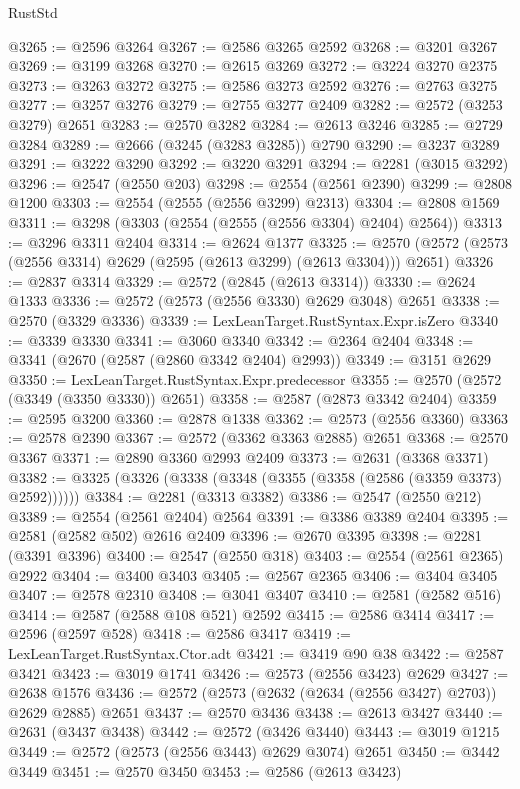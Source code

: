 \begin{lexlean}{RustStd}
\begin{coremodule}
@3265 := @2596 @3264
@3267 := @2586 @3265 @2592
@3268 := @3201 @3267
@3269 := @3199 @3268
@3270 := @2615 @3269
@3272 := @3224 @3270 @2375
@3273 := @3263 @3272
@3275 := @2586 @3273 @2592
@3276 := @2763 @3275
@3277 := @3257 @3276
@3279 := @2755 @3277 @2409
@3282 := @2572 (@3253 @3279) @2651
@3283 := @2570 @3282
@3284 := @2613 @3246
@3285 := @2729 @3284
@3289 := @2666 (@3245 (@3283 @3285)) @2790
@3290 := @3237 @3289
@3291 := @3222 @3290
@3292 := @3220 @3291
@3294 := @2281 (@3015 @3292)
@3296 := @2547 (@2550 @203)
@3298 := @2554 (@2561 @2390)
@3299 := @2808 @1200
@3303 := @2554 (@2555 (@2556 @3299) @2313)
@3304 := @2808 @1569
@3311 := @3298 (@3303 (@2554 (@2555 (@2556 @3304) @2404) @2564))
@3313 := @3296 @3311 @2404
@3314 := @2624 @1377
@3325 := @2570 (@2572 (@2573 (@2556 @3314) @2629 (@2595 (@2613 @3299) (@2613 @3304))) @2651)
@3326 := @2837 @3314
@3329 := @2572 (@2845 (@2613 @3314))
@3330 := @2624 @1333
@3336 := @2572 (@2573 (@2556 @3330) @2629 @3048) @2651
@3338 := @2570 (@3329 @3336)
@3339 := LexLeanTarget.RustSyntax.Expr.isZero
@3340 := @3339 @3330
@3341 := @3060 @3340
@3342 := @2364 @2404
@3348 := @3341 (@2670 (@2587 (@2860 @3342 @2404) @2993))
@3349 := @3151 @2629
@3350 := LexLeanTarget.RustSyntax.Expr.predecessor
@3355 := @2570 (@2572 (@3349 (@3350 @3330)) @2651)
@3358 := @2587 (@2873 @3342 @2404)
@3359 := @2595 @3200
@3360 := @2878 @1338
@3362 := @2573 (@2556 @3360)
@3363 := @2578 @2390
@3367 := @2572 (@3362 @3363 @2885) @2651
@3368 := @2570 @3367
@3371 := @2890 @3360 @2993 @2409
@3373 := @2631 (@3368 @3371)
@3382 := @3325 (@3326 (@3338 (@3348 (@3355 (@3358 (@2586 (@3359 @3373) @2592))))))
@3384 := @2281 (@3313 @3382)
@3386 := @2547 (@2550 @212)
@3389 := @2554 (@2561 @2404) @2564
@3391 := @3386 @3389 @2404
@3395 := @2581 (@2582 @502) @2616 @2409
@3396 := @2670 @3395
@3398 := @2281 (@3391 @3396)
@3400 := @2547 (@2550 @318)
@3403 := @2554 (@2561 @2365) @2922
@3404 := @3400 @3403
@3405 := @2567 @2365
@3406 := @3404 @3405
@3407 := @2578 @2310
@3408 := @3041 @3407
@3410 := @2581 (@2582 @516)
@3414 := @2587 (@2588 @108 @521) @2592
@3415 := @2586 @3414
@3417 := @2596 (@2597 @528)
@3418 := @2586 @3417
@3419 := LexLeanTarget.RustSyntax.Ctor.adt
@3421 := @3419 @90 @38
@3422 := @2587 @3421
@3423 := @3019 @1741
@3426 := @2573 (@2556 @3423) @2629
@3427 := @2638 @1576
@3436 := @2572 (@2573 (@2632 (@2634 (@2556 @3427) @2703)) @2629 @2885) @2651
@3437 := @2570 @3436
@3438 := @2613 @3427
@3440 := @2631 (@3437 @3438)
@3442 := @2572 (@3426 @3440)
@3443 := @3019 @1215
@3449 := @2572 (@2573 (@2556 @3443) @2629 @3074) @2651
@3450 := @3442 @3449
@3451 := @2570 @3450
@3453 := @2586 (@2613 @3423)

\end{coremodule}
\end{lexlean}
